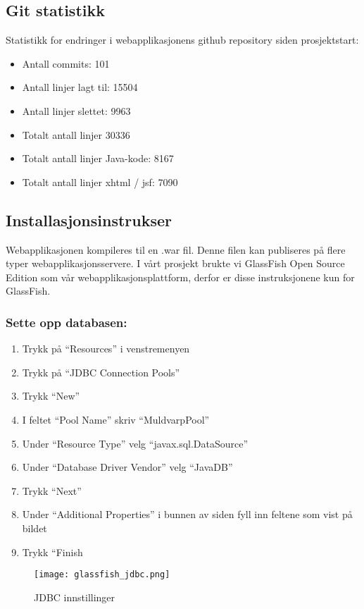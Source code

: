 \documentclass[../main.tex]{subfiles}
\begin{document}
\subsection{Git statistikk}

Statistikk for endringer i webapplikasjonens github repository siden prosjektstart:
\begin{itemize}
\item Antall commits: 101
\item Antall linjer lagt til: 15504
\item Antall linjer slettet: 9963
\item Totalt antall linjer 30336
\item Totalt antall linjer Java-kode: 8167
\item Totalt antall linjer xhtml / jsf: 7090
\end{itemize}

\subsection{Installasjonsinstrukser}

Webapplikasjonen kompileres til en .war fil. Denne filen kan publiseres på flere typer webapplikasjonsservere. I vårt prosjekt brukte vi GlassFish Open Source Edition som vår webapplikasjonsplattform, derfor er disse instruksjonene kun for GlassFish.

\subsubsection{Sette opp databasen:}

\begin{enumerate}
\item Trykk på “Resources” i venstremenyen
\item Trykk på “JDBC Connection Pools”
\item Trykk “New”
\item I feltet “Pool Name” skriv “MuldvarpPool”
\item Under “Resource Type” velg “javax.sql.DataSource”
\item Under “Database Driver Vendor” velg “JavaDB”
\item Trykk “Next”
\item Under “Additional Properties” i bunnen av siden fyll inn feltene som vist på bildet
\item Trykk “Finish
\end{enumerate}

\begin{figure}[H]
  \centering
  \texttt{[image: glassfish\_jdbc.png]}
  \caption{JDBC innstillinger}
\end{figure}
\end{document}
